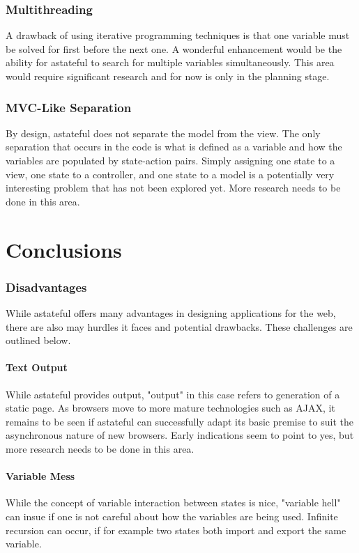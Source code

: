 \documentclass[11pt,twocolumn]{article}
\begin{document}
\section{Multithreading}
A drawback of using iterative programming techniques is that one variable must be solved for first before the next one. A wonderful enhancement would be the ability for astateful to search for multiple variables simultaneously. This area would require significant research and for now is only in the planning stage.
\section{MVC-Like Separation}
By design, astateful does not separate the model from the view. The only separation that occurs in the code is what is defined as a variable and how the variables are populated by state-action pairs. Simply assigning one state to a view, one state to a controller, and one state to a model is a potentially very interesting problem that has not been explored yet. More research needs to be done in this area.

\newpage
\part{Conclusions}
\section{Disadvantages}
While astateful offers many advantages in designing applications for the web, there are also may hurdles it faces and potential drawbacks. These challenges are outlined below.
\subsection{Text Output}
While astateful provides output, "output" in this case refers to generation of a static page. As browsers move to more mature technologies such as AJAX, it remains to be seen if astateful can successfully adapt its basic premise to suit the asynchronous nature of new browsers. Early indications seem to point to yes, but more research needs to be done in this area.
\subsection{Variable Mess}
While the concept of variable interaction between states is nice, "variable hell" can insue if one is not careful about how the variables are being used. Infinite recursion can occur, if for example two states both import and export the same variable.
\end{document}
